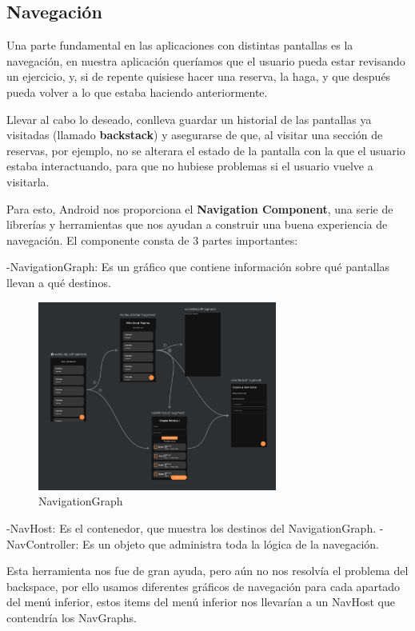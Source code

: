 \documentclass[12pt,a4paper]{article}
\begin{document}
\subsection{Navegación}

Una parte fundamental en las aplicaciones con distintas pantallas es la navegación, en nuestra aplicación queríamos que el usuario pueda estar 
revisando un ejercicio, y, si de repente quisiese hacer una reserva, la haga, y que después pueda volver a lo que estaba haciendo anteriormente.

Llevar al cabo lo deseado, conlleva guardar un historial de las pantallas ya visitadas (llamado \textbf{backstack}) y asegurarse de que, al visitar una sección de
reservas, por ejemplo, no se alterara el estado de la pantalla con la que el usuario estaba interactuando,
para que no hubiese problemas si el usuario vuelve a visitarla.

Para esto, Android nos proporciona el \textbf{Navigation Component},
una serie de librerías y herramientas que nos ayudan a construir una buena experiencia de navegación.
El componente consta de 3 partes importantes:

-NavigationGraph: Es un gráfico que contiene información sobre qué pantallas llevan a qué destinos.

\begin{figure}[h]
  \centering
 \includegraphics[width=0.7\textwidth]{nav_graph}
 \caption{NavigationGraph}
\end{figure}

-NavHost: Es el contenedor, que muestra los destinos del NavigationGraph.
-NavController: Es un objeto que administra toda la lógica de la navegación.


Esta herramienta nos fue de gran ayuda, pero aún no nos resolvía el problema del backspace,
por ello usamos diferentes gráficos de navegación para cada apartado del menú inferior,
estos items del menú inferior nos llevarían a un NavHost que contendría los NavGraphs.
\end{document}
